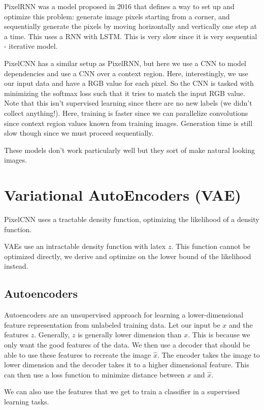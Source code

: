 PixelRNN was a model proposed in 2016 that defines a way to set up and optimize this problem: generate image pixels starting from a corner, and sequentially generate the pixels by moving horizontally and vertically one step at a time. This uses a RNN with LSTM. This is very slow since it is very sequential - iterative model.

PixelCNN has a similar setup as PixelRNN, but here we use a CNN to model dependencies and use a CNN over a context region. Here, interestingly, we use our input data and have a RGB value for each pixel. So the CNN is tasked with minimizing the softmax loss such that it tries to match the input RGB value. Note that this isn't supervised learning since there are no new labels (we didn't collect anything!). Here, training is faster since we can parallelize convolutions since context region values known from training images. Generation time is still slow though since we must proceed sequentially.

These models don't work particularly well but they sort of make natural looking images. 

\section{Variational AutoEncoders (VAE)}

PixelCNN uses a tractable density function, optimizing the likelihood of a density function. 

VAEs use an intractable density function with latex $z$. This function cannot be optimized directly, we derive and optimize on the lower bound of the likelihood instead. 

\subsection{Autoencoders}

Autoencoders are an unsupervised approach for learning a lower-dimensional feature representation from unlabeled training data. Let our input be $x$ and the features $z$. Generally, $z$ is generally lower dimension than $x$. This is because we only want the good features of the data. We then use a decoder that should be able to use these features to recreate the image $\hat{x}$. The encoder takes the image to lower dimension and the decoder takes it to a higher dimensional feature. This can then use a loss function to minimize distance between $x$ and $\hat{x}$.

We can also use the features that we get to train a classifier in a supervised learning tasks.

